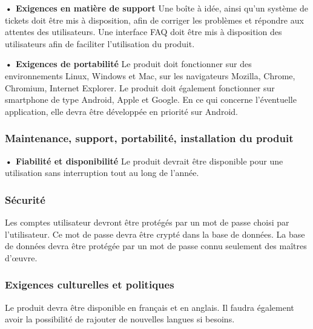 \textbf{• Exigences en matière de support}
Une boîte à idée, ainsi qu’un système de tickets doit être mis à disposition, afin de corriger les problèmes et répondre aux attentes des utilisateurs.
Une interface FAQ doit être mis à disposition des utilisateurs afin de faciliter l’utilisation du produit.

\textbf{• Exigences de portabilité}
Le produit doit fonctionner sur des environnements Linux, Windows et Mac, sur les navigateurs Mozilla, Chrome, Chromium, Internet Explorer. Le produit doit également fonctionner sur smartphone de type Android, Apple et Google. En ce qui concerne l’éventuelle application, elle devra être développée en priorité sur Android.

\subsubsection{Maintenance, support, portabilité, installation du produit}

\textbf{• Fiabilité et disponibilité}
Le produit devrait être disponible pour une utilisation sans interruption tout au long de l’année.  

\subsubsection{Sécurité}

Les comptes utilisateur devront être protégés par un mot de passe choisi par l’utilisateur. Ce mot de passe devra être crypté dans la base de données.
La base de données devra être protégée par un mot de passe connu seulement des maîtres d’œuvre.

\subsubsection{Exigences culturelles et politiques}

Le produit devra être disponible en français et en anglais. Il faudra également avoir la possibilité de rajouter de nouvelles langues si besoins.